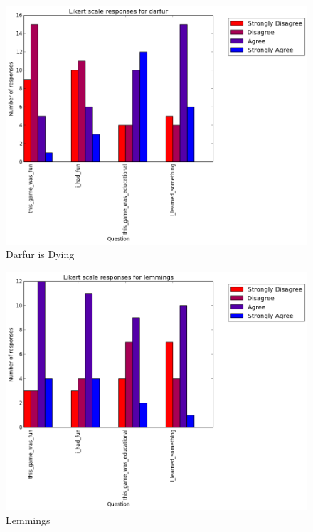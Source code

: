 			\begin{figure}[h] 
			\centering 
			\includegraphics[width=\textwidth]{darfur_likert.png} 
			\caption{Darfur is Dying}
			\end{figure}

			\begin{figure}[h] 
			\centering 
			\includegraphics[width=\textwidth]{lemmings_likert.png} 
			\caption{Lemmings}
			\end{figure}

